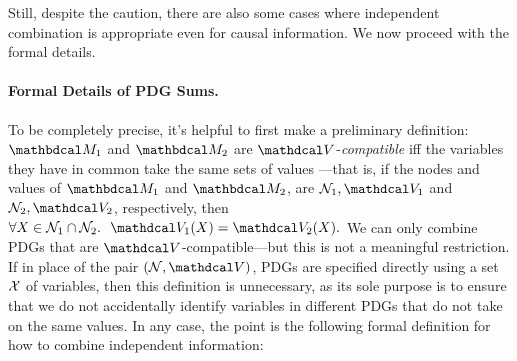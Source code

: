 Still, despite the caution, there are also some cases where independent combination is appropriate even for causal information. We now proceed with the formal details.


\paragraph{Formal Details of PDG Sums.}
To be completely precise, it's helpful to first make a preliminary definition:	
$\dg M_1$ and $\dg M_2$ are $\V$-\emph{compatible}
iff the variables they have in common take the same sets of values%
---that is, if the nodes and values of $\dg M_1$ and $\dg M_2$,
are $\N_1, \V_1$ and $\N_2, \V_2$, respectively, then
$
\forall X \in \N_1 \cap \N_2.~~
	\V_1( X) = \V_2 (X). $
%
%
%
We can only combine PDGs that are $\V$-compatible---but this is not a meaningful restriction. 
If in place of the pair $(\N, \V)$, PDGs are specified directly using a set $\mathcal X$ of variables, then this definition is unnecessary, as its sole purpose is to ensure that we do not accidentally identify variables in different PDGs that do not take on the same values. 
%
In any case, the point is the following formal definition for how to combine independent information:

